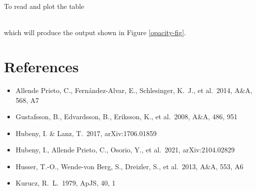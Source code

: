 \documentclass[]{article}
\begin{document}
To read and plot the table

\\

\noindent which will produce the output shown in Figure \ref{opacity-fig}.

\section{References}

\begin{itemize}
\item Allende Prieto, C., Fern{\'a}ndez-Alvar, E., Schlesinger, K.~J., et al.\ 2014, A\&A, 568, A7 
\item Gustafsson, B., Edvardsson, B., Eriksson, K., et al.\ 2008, A\&A, 486, 951
\item Hubeny, I. \& Lanz, T.\ 2017, arXiv:1706.01859
\item Hubeny, I., Allende Prieto, C., Osorio, Y., et al.\ 2021, arXiv:2104.02829
\item Husser, T.-O., Wende-von Berg, S., Dreizler, S., et al.\ 2013, A\&A, 553, A6
\item Kurucz, R.~L.\ 1979, ApJS, 40, 1

\end{itemize}
\end{document}
